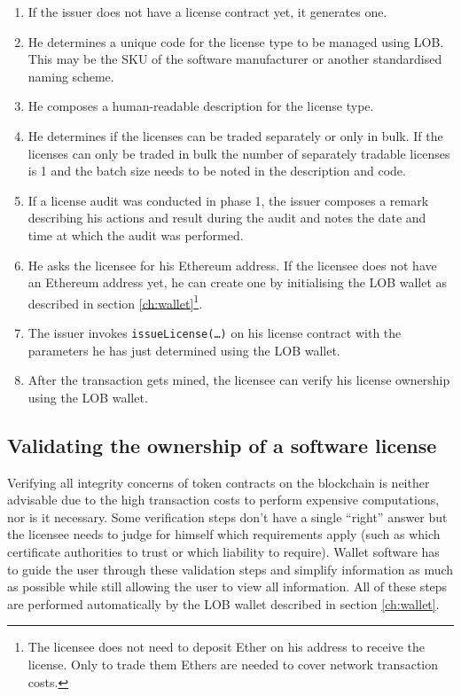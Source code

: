 \documentclass[a4paper]{article}
\begin{document}
\begin{enumerate}
  \item If the issuer does not have a license contract yet, it generates one.
  \item He determines a unique code for the license type to be managed using LOB. This may be the SKU of the software manufacturer or another standardised naming scheme.
  \item He composes a human-readable description for the license type.
  \item He determines if the licenses can be traded separately or only in bulk. If the licenses can only be traded in bulk the number of separately tradable licenses is 1 and the batch size needs to be noted in the description and code.
  \item If a license audit was conducted in phase 1, the issuer composes a remark describing his actions and result during the audit and notes the date and time at which the audit was performed.
  \item He asks the licensee for his Ethereum address. If the licensee does not have an Ethereum address yet, he can create one by initialising the LOB wallet as described in section \ref{ch:wallet}\footnote{The licensee does not need to deposit Ether on his address to receive the license. Only to trade them Ethers are needed to cover network transaction costs.}.
  \item The issuer invokes \texttt{issueLicense(…)} on his license contract with the parameters he has just determined using the LOB wallet.
  \item After the transaction gets mined, the licensee can verify his license ownership using the LOB wallet.
\end{enumerate}





\subsection{Validating the ownership of a software license}

Verifying all integrity concerns of token contracts on the blockchain is neither advisable due to the high transaction costs to perform expensive computations, nor is it necessary. Some verification steps don't have a single “right” answer but the licensee needs to judge for himself which requirements apply (such as which certificate authorities to trust or which liability to require). Wallet software has to guide the user through these validation steps and simplify information as much as possible while still allowing the user to view all information. All of these steps are performed automatically by the LOB wallet described in section \ref{ch:wallet}.
\end{document}
